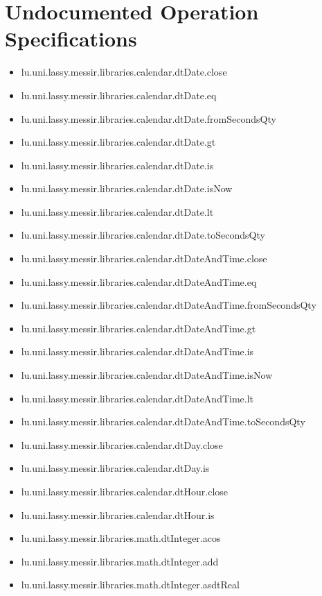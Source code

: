 \section[Undocumented Operation Specifications]{Undocumented Operation Specifications}
\begin{itemize}
\item lu.uni.lassy.messir.libraries.calendar.dtDate.close 
\item lu.uni.lassy.messir.libraries.calendar.dtDate.eq 
\item lu.uni.lassy.messir.libraries.calendar.dtDate.fromSecondsQty 
\item lu.uni.lassy.messir.libraries.calendar.dtDate.gt 
\item lu.uni.lassy.messir.libraries.calendar.dtDate.is 
\item lu.uni.lassy.messir.libraries.calendar.dtDate.isNow 
\item lu.uni.lassy.messir.libraries.calendar.dtDate.lt 
\item lu.uni.lassy.messir.libraries.calendar.dtDate.toSecondsQty 
\item lu.uni.lassy.messir.libraries.calendar.dtDateAndTime.close 
\item lu.uni.lassy.messir.libraries.calendar.dtDateAndTime.eq 
\item lu.uni.lassy.messir.libraries.calendar.dtDateAndTime.fromSecondsQty 
\item lu.uni.lassy.messir.libraries.calendar.dtDateAndTime.gt 
\item lu.uni.lassy.messir.libraries.calendar.dtDateAndTime.is 
\item lu.uni.lassy.messir.libraries.calendar.dtDateAndTime.isNow 
\item lu.uni.lassy.messir.libraries.calendar.dtDateAndTime.lt 
\item lu.uni.lassy.messir.libraries.calendar.dtDateAndTime.toSecondsQty 
\item lu.uni.lassy.messir.libraries.calendar.dtDay.close 
\item lu.uni.lassy.messir.libraries.calendar.dtDay.is 
\item lu.uni.lassy.messir.libraries.calendar.dtHour.close 
\item lu.uni.lassy.messir.libraries.calendar.dtHour.is 
\item lu.uni.lassy.messir.libraries.math.dtInteger.acos 
\item lu.uni.lassy.messir.libraries.math.dtInteger.add 
\item lu.uni.lassy.messir.libraries.math.dtInteger.asdtReal 

\end{itemize}
